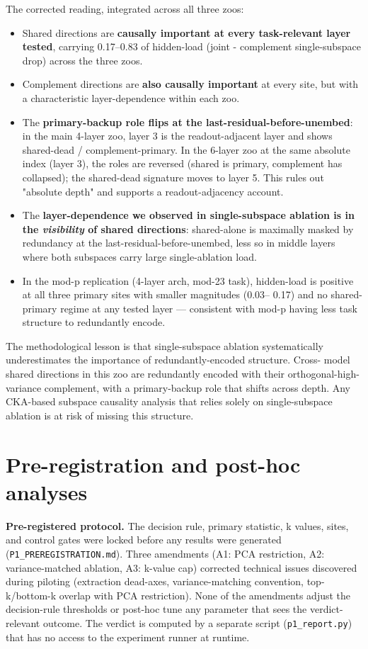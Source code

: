 The corrected reading, integrated across all three zoos:

\begin{itemize}
  \item Shared directions are \textbf{causally important at every task-relevant layer tested}, carrying 0.17--0.83 of hidden-load (joint - complement single-subspace drop) across the three zoos.
  \item Complement directions are \textbf{also causally important} at every site, but with a characteristic layer-dependence within each zoo.
  \item The \textbf{primary-backup role flips at the last-residual-before-unembed}: in the main 4-layer zoo, layer 3 is the readout-adjacent layer and shows shared-dead / complement-primary. In the 6-layer zoo at the same absolute index (layer 3), the roles are reversed (shared is primary, complement has collapsed); the shared-dead signature moves to layer 5. This rules out "absolute depth" and supports a readout-adjacency account.
  \item The \textbf{layer-dependence we observed in single-subspace ablation is in the \emph{visibility} of shared directions}: shared-alone is maximally masked by redundancy at the last-residual-before-unembed, less so in middle layers where both subspaces carry large single-ablation load.
  \item In the mod-p replication (4-layer arch, mod-23 task), hidden-load is positive at all three primary sites with smaller magnitudes (0.03-- 0.17) and no shared-primary regime at any tested layer --- consistent with mod-p having less task structure to redundantly encode.
\end{itemize}

The methodological lesson is that single-subspace ablation systematically
underestimates the importance of redundantly-encoded structure. Cross-
model shared directions in this zoo are redundantly encoded with their
orthogonal-high-variance complement, with a primary-backup role that
shifts across depth. Any CKA-based subspace causality analysis that
relies solely on single-subspace ablation is at risk of missing this
structure.


\section{Pre-registration and post-hoc analyses}

\textbf{Pre-registered protocol.} The decision rule, primary statistic, k
values, sites, and control gates were locked before any results were
generated (\texttt{P1\_PREREGISTRATION.md}). Three amendments (A1: PCA
restriction, A2: variance-matched ablation, A3: k-value cap) corrected
technical issues discovered during piloting (extraction dead-axes,
variance-matching convention, top-k/bottom-k overlap with PCA
restriction). None of the amendments adjust the decision-rule
thresholds or post-hoc tune any parameter that sees the verdict-relevant
outcome. The verdict is computed by a separate script (\texttt{p1\_report.py})
that has no access to the experiment runner at runtime.

